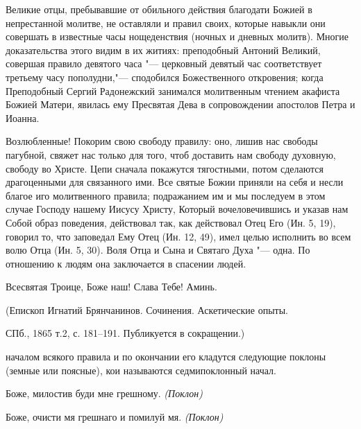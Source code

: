 Великие отцы, пребывавшие от обильного действия благодати Божией в непрестанной молитве, не оставляли и правил своих, которые навыкли они совершать в известные часы нощеденствия (ночных и дневных молитв). Многие доказательства этого видим в их житиях: преподобный Антоний Великий, совершая правило девятого часа "--- церковный девятый час соответствует третьему часу пополудни,"--- сподобился Божественного откровения; когда Преподобный Сергий Радонежский занимался молитвенным чтением акафиста Божией Матери, явилась ему Пресвятая Дева в сопровождении апостолов Петра и Иоанна.

Возлюбленные! Покорим свою свободу правилу: оно, лишив нас свободы пагубной, свяжет нас только для того, чтоб доставить нам свободу духовную, свободу во Христе. Цепи сначала покажутся тягостными, потом сделаются драгоценными для связанного ими. Все святые Божии приняли на себя и несли благое иго молитвенного правила; подражанием им и мы последуем в этом случае Господу нашему Иисусу Христу, Который вочеловечившись и указав нам Собой образ поведения, действовал так, как действовал Отец Его (Ин. 5, 19), говорил то, что заповедал Ему Отец (Ин. 12, 49), имел целью исполнить во всем волю Отца (Ин. 5, 30). Воля Отца и Сына и Святаго Духа "--- одна. По отношению к людям она заключается в спасении людей.

Всесвятая Троице, Боже наш! Слава Тебе! Аминь.

\bigskip

(Епископ Игнатий Брянчанинов. Сочинения. Аскетические опыты.

СПб., 1865 т.2, с. 181--191. Публикуется в сокращении.)

 


\mychapterending

 





  началом всякого правила и по окончании его кладутся следующие поклоны (земные или поясные), кои называются седмипоклонный начал.




\normalfont{}




Боже, милостив буди мне грешному. \itshape (Поклон) \normalfont{}

Боже, очисти мя грешнаго и помилуй мя. \itshape (Поклон)


\normalfont{}




